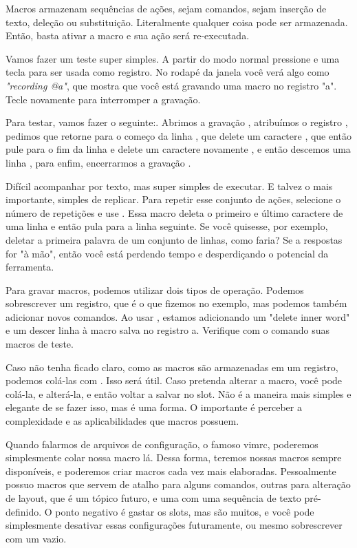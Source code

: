 Macros armazenam sequências de ações, sejam comandos, sejam inserção de texto, deleção ou substituição.
Literalmente qualquer coisa pode ser armazenada. Então, basta ativar a macro e sua ação será re-executada.

Vamos fazer um teste super simples.
A partir do modo normal pressione  e uma tecla para ser usada como registro.
No rodapé da janela você verá algo como \textit{"recording @a"}, que mostra que você está gravando
uma macro no registro "a".
Tecle novamente  para interromper a gravação.

Para testar, vamos fazer o seguinte:.
Abrimos a gravação , atribuímos o registro ,
pedimos que retorne para o começo da linha , que delete um caractere
, que então pule para o fim da linha \vimcommand{\$}
e delete um caractere novamente , e então descemos uma linha ,
para enfim, encerrarmos a gravação .

Difícil acompanhar por texto, mas super simples de executar.
E talvez o mais importante, simples de replicar.
Para repetir esse conjunto de ações, selecione o número de repetições e use .
Essa macro deleta o primeiro e último caractere de uma linha e então pula para a linha seguinte.
Se você quisesse, por exemplo, deletar a primeira palavra de um conjunto de linhas, como faria?
Se a respostas for "à mão", então você está perdendo tempo e desperdiçando o potencial da ferramenta.

Para gravar macros, podemos utilizar dois tipos de operação.
Podemos sobrescrever um registro, que é o que fizemos no exemplo, mas podemos também adicionar novos comandos.
Ao usar , estamos adicionando um "delete inner word" e um descer linha à macro salva no registro a.
Verifique com o comando  suas macros de teste.

Caso não tenha ficado claro, como as macros são armazenadas em um registro, podemos colá-las com .
Isso será útil.
Caso pretenda alterar a macro, você pode colá-la, e alterá-la, e então voltar a salvar no slot.
Não é a maneira mais simples e elegante de se fazer isso, mas é uma forma.
O importante é perceber a complexidade e as aplicabilidades que macros possuem.

Quando falarmos de arquivos de configuração, o famoso vimrc, poderemos simplesmente colar nossa macro lá.
Dessa forma, teremos nossas macros sempre disponíveis, e poderemos criar macros cada vez mais elaboradas.
Pessoalmente possuo macros que servem de atalho para alguns comandos, outras para alteração de layout,
que é um tópico futuro, e uma com uma sequência de texto pré-definido.
O ponto negativo é gastar os slots, mas são muitos, e você pode simplesmente desativar essas configurações
futuramente, ou mesmo sobrescrever com um vazio.

